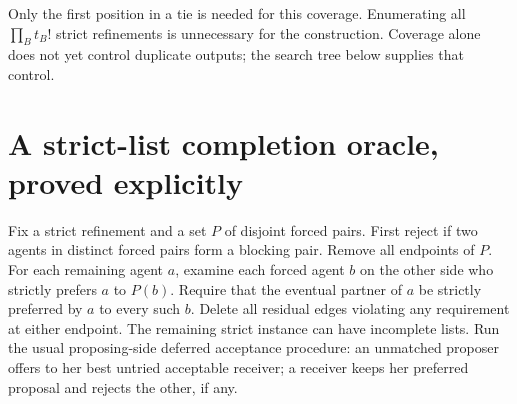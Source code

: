 \documentclass[11pt]{article}
\theoremstyle{remark}
\begin{document}
Only the first position in a tie is needed for this coverage. Enumerating
all $\prod_B t_B!$ strict refinements is unnecessary for the construction.
Coverage alone does not yet control duplicate outputs; the search tree
below supplies that control.

\section{A strict-list completion oracle, proved explicitly}
Fix a strict refinement and a set $P$ of disjoint forced pairs. First
reject if two agents in distinct forced pairs form a blocking pair.
Remove all endpoints of $P$. For each remaining agent $a$, examine each
forced agent $b$ on the other side who strictly prefers $a$ to $P(b)$.
Require that the eventual partner of $a$ be strictly preferred by $a$
to every such $b$. Delete all residual edges violating any requirement
at either endpoint. The remaining strict instance can have incomplete
lists. Run the usual proposing-side deferred acceptance procedure:
an unmatched proposer offers to her best untried acceptable receiver;
a receiver keeps her preferred proposal and rejects the other, if any.
\end{document}
